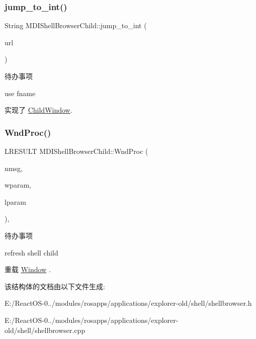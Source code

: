 \subsubsection{\texorpdfstring{jump\+\_\+to\+\_\+int()}{jump\_to\_int()}}
{\footnotesize\ttfamily String M\+D\+I\+Shell\+Browser\+Child\+::jump\+\_\+to\+\_\+int (\begin{DoxyParamCaption}\item[{L\+P\+C\+T\+S\+TR}]{url }\end{DoxyParamCaption})\hspace{0.3cm}{\ttfamily [virtual]}}

\begin{DoxyRefDesc}{待办事项}
\item[\hyperlink{todo__todo000048}{待办事项}]use fname \end{DoxyRefDesc}


实现了 \hyperlink{struct_child_window}{Child\+Window}.

\mbox{\label{struct_m_d_i_shell_browser_child_a549230d9766a8cd6202a7dfd11ab711e}} 
\subsubsection{\texorpdfstring{Wnd\+Proc()}{WndProc()}}
{\footnotesize\ttfamily L\+R\+E\+S\+U\+LT M\+D\+I\+Shell\+Browser\+Child\+::\+Wnd\+Proc (\begin{DoxyParamCaption}\item[{U\+I\+NT}]{nmsg,  }\item[{W\+P\+A\+R\+AM}]{wparam,  }\item[{L\+P\+A\+R\+AM}]{lparam }\end{DoxyParamCaption})\hspace{0.3cm}{\ttfamily [protected]}, {\ttfamily [virtual]}}

\begin{DoxyRefDesc}{待办事项}
\item[\hyperlink{todo__todo000047}{待办事项}]refresh shell child \end{DoxyRefDesc}


重载 \hyperlink{struct_window}{Window} .



该结构体的文档由以下文件生成\+:\begin{DoxyCompactItemize}
\item 
E\+:/\+React\+O\+S-\/0../modules/rosapps/applications/explorer-\/old/shell/shellbrowser.\+h\item 
E\+:/\+React\+O\+S-\/0../modules/rosapps/applications/explorer-\/old/shell/shellbrowser.\+cpp\end{DoxyCompactItemize}
